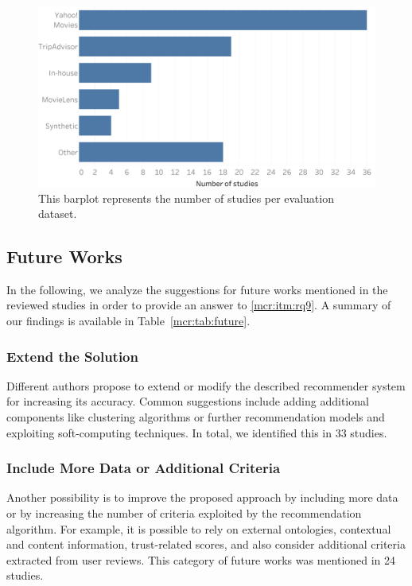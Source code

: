 \begin{figure}
\centering
\includegraphics[width=\textwidth]{dataset_per_study}
\caption[Studies per evaluation dataset]{This barplot represents the number of studies per evaluation dataset.}
\label{mcr:fig:dataset-per-study}
\end{figure}

\subsection{Future Works}
\label{mcr:sec:future}

In the following, we analyze the suggestions for future works mentioned in the reviewed studies in order to provide an answer to \ref{mcr:itm:rq9}. A summary of our findings is available in Table~\ref{mcr:tab:future}.

\subsubsection{Extend the Solution}

Different authors propose to extend or modify the described recommender system for increasing its accuracy.  Common suggestions include adding additional components like clustering algorithms or further recommendation models and exploiting soft-computing techniques. In total, we identified this  in 33 studies.

\subsubsection{Include More Data or Additional Criteria}

Another possibility is to improve the proposed approach by including more data or by increasing the number of criteria exploited by the recommendation algorithm. For example, it is possible to rely on external ontologies, contextual and content information, trust-related scores, and also consider additional criteria extracted from user reviews. This category of future works was mentioned in 24 studies.

